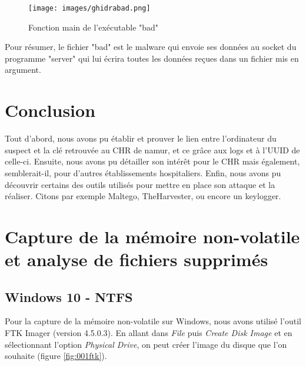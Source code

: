 \documentclass[a4paper]{article}
\begin{document}
\begin{figure}[H]
    \centering
    \texttt{[image: images/ghidrabad.png]}
    \caption{Fonction main de l'exécutable "bad"}
    \label{fig:ghidra_bad}
\end{figure}

Pour résumer, le fichier "bad" est le malware qui envoie ses données au socket du programme "server" qui lui écrira toutes les données reçues dans un fichier mis en argument.









\section{Conclusion}
Tout d'abord, nous avons pu établir et prouver le lien entre l'ordinateur du suspect et la clé retrouvée au CHR de namur, et ce grâce aux logs et à l'UUID de celle-ci. Ensuite, nous avons pu détailler son intérêt pour le CHR mais également, semblerait-il, pour d'autres établissements hospitaliers. Enfin, nous avons pu découvrir certains des outils utilisés pour mettre en place son attaque et la réaliser. Citons par exemple Maltego, TheHarvester, ou encore un keylogger.









\newpage \appendix










\section{Capture de la mémoire non-volatile et analyse de fichiers supprimés}



\subsection{Windows 10 - NTFS} \label{sec:CaptureWindows10}

Pour la capture de la mémoire non-volatile sur Windows, nous avons utilisé l'outil FTK Imager (version 4.5.0.3). En allant dans \textit{File} puis \textit{Create Disk Image} et en sélectionnant l'option \textit{Physical Drive}, on peut créer l'image du disque que l'on souhaite (figure \ref{fig:001ftk}).
\end{document}
